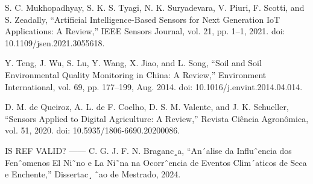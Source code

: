 \documentclass[conference]{IEEEtran}
\begin{document}
\begin{thebibliography}{00}
 S. C. Mukhopadhyay, S. K. S. Tyagi, N. K. Suryadevara, V. Piuri, F. Scotti, and S. Zeadally, 
``Artificial Intelligence-Based Sensors for Next Generation IoT Applications: A Review,'' 
IEEE Sensors Journal, vol. 21, pp. 1--1, 2021. doi: 10.1109/jsen.2021.3055618.

 Y. Teng, J. Wu, S. Lu, Y. Wang, X. Jiao, and L. Song, 
``Soil and Soil Environmental Quality Monitoring in China: A Review,'' 
Environment International, vol. 69, pp. 177--199, Aug. 2014. doi: 10.1016/j.envint.2014.04.014.

 D. M. de Queiroz, A. L. de F. Coelho, D. S. M. Valente, and J. K. Schueller, 
``Sensors Applied to Digital Agriculture: A Review,'' 
Revista Ciência Agronômica, vol. 51, 2020. doi: 10.5935/1806-6690.20200086.

 \end{thebibliography}
 \vspace{12pt}
 \color{red}

IS REF VALID? ------  C. G. J. F. N. Braganc¸a, “An´alise da Influˆencia dos Fenˆomenos El Ni˜no
e La Ni˜na na Ocorrˆencia de Eventos Clim´aticos de Seca e Enchente,”
Dissertac¸ ˜ao de Mestrado, 2024.  
\end{document}
